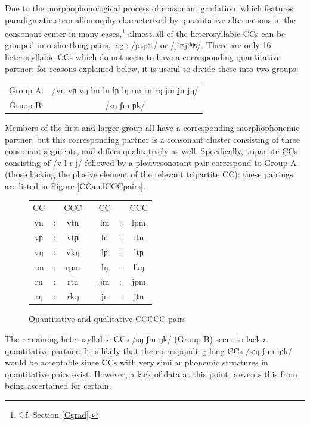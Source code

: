 Due to the morphophonological process of consonant gradation, which features paradigmatic stem allomorphy characterized by quantitative alternations in the consonant center in many cases,\footnote{Cf. Section \ref{Cgrad}.} 
almost all of the heterosyllabic CCs can be grouped into short\TILDE long pairs, e.g.: /pt\TILDE pːt/ or /jʰʦ\TILDE jːʰʦ/. There are only 16 heterosyllabic CCs which do not seem to have a corresponding quantitative partner; for reasons explained below, it is useful to divide these into two groups: %
\begin{center}
\begin{tabular}{c c}
Group A: & /vn vɲ vŋ lm ln lɲ lŋ rm rn rŋ jm jn jŋ/\\
Gruop B: & /sŋ ʃm ɲk/ \\
\end{tabular}
\end{center}
Members of the first and larger group all have a corresponding morphophonemic partner, but this corresponding partner is a consonant cluster consisting of three consonant segments, and differs qualitatively as well. Specifically, tripartite CCs consisting of /v l r j/ followed by a plosive\PLUS sonorant pair %
correspond to Group A (those lacking the plosive element of the relevant tripartite CC); these pairings are listed in Figure \vref{CCandCCCpairs}. 
\begin{figure}\centering
\begin{tabular}{ccc p{30pt} ccc}
CC	&\TILDE & CCC	&&	CC	&\TILDE & CCC\\\cline{1-3}\cline{5-7}
vn	&:& vtn 	&&	lm	&:& lpm \\
vɲ	&:& vtɲ 	&&	ln	&:& ltn \\
vŋ	&:& vkŋ	&&	lɲ	&:& ltɲ \\
rm	&:& rpm	&&	lŋ	&:& lkŋ \\
rn	&:& rtn	&&	jm	&:& jpm \\
rŋ	&:& rkŋ 	&&	jn	&:& jtn \\%
\end{tabular}
\caption{Quantitative and qualitative CC\TILDE CCC pairs}\label{CCandCCCpairs}
\end{figure}
The remaining heterosyllabic CCs /sŋ ʃm ŋk/ (Group B) seem to lack a quantitative partner. It is likely that the corresponding long CCs /sːŋ ʃːm ŋːk/ would be acceptable since CCs with very similar phonemic structures in quantitative pairs exist. However, a lack of data at this point prevents this from being ascertained for certain.


